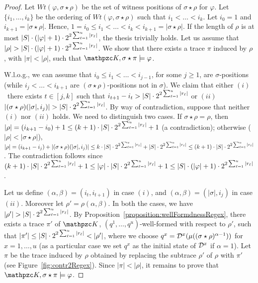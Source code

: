 \begin{proof} 
Let $Wt(\varphi,\sigma\star\rho)$ be the set of witness positions of $\sigma\star\rho$ for $\varphi$.
Let $\{i_1,\ldots,i_k\}$ be the ordering of $Wt(\varphi,\sigma\star\rho)$ such that
$i_1<\ldots <i_k$. Let $i_0=1$ and $i_{k+1}=|\sigma\star\rho|$. Hence, $1=i_0\leq  i_1<\ldots <i_k < i_{k+1}=|\sigma\star\rho|$.
%
If the length of $\rho$ is at most $|S|\cdot (|\varphi|+1) \cdot 2^{2\sum_{\ell=1}^u |r_\ell|}$, the thesis trivially holds.
Let us assume that $|\rho|> |\States|\cdot (|\varphi|+1) \cdot 2^{2\sum_{\ell=1}^u |r_\ell|}$. We show that there exists a trace $\pi$ induced by $\rho$, with $|\pi| < |\rho |$, such that $\Ku,\sigma\star\pi\models \varphi$. 

W.l.o.g., we can assume that $i_0\leq i_1<\ldots <i_{j-1}$, for some $j\geq 1$, are $\sigma$-positions (while $i_{j}<\ldots <i_{k+1}$ are $(\sigma\star\rho)$-positions not in $\sigma$). We claim that either $(i)$~there exists $t\in [j,k]$ such that $i_{t+1}-i_t>|S|\cdot 2^{2\sum_{\ell=1}^u |r_\ell|}$ or $(ii)$~$|(\sigma\star\rho)(|\sigma|,i_{j})|>|\States|\cdot 2^{2\sum_{\ell=1}^u |r_\ell|}$. By way of contradiction, suppose that neither $(i)$ nor $(ii)$ holds. We need to distinguish two cases. 
If $\sigma\star\rho=\rho$, then 
$|\rho| = (i_{k+1}-i_0)+1\leq (k+1) \cdot |S|\cdot 2^{2\sum_{\ell=1}^u |r_\ell|} +1$ (a contradiction); 
otherwise ($|\rho| < |\sigma\star\rho|$), $|\rho| = (i_{k+1} - i_{j}) + |(\sigma\star\rho)(|\sigma|,i_{j})| \leq k \cdot |S|\cdot 2^{2\sum_{\ell=1}^u |r_\ell|} + |S|\cdot 2^{2\sum_{\ell=1}^u |r_\ell|} \leq (k+1) \cdot |S|\cdot 2^{2\sum_{\ell=1}^u |r_\ell|}$. The contradiction follows since $(k+1) \cdot |S|\cdot 2^{2\sum_{\ell=1}^u |r_\ell|}+1 \leq |\varphi| \cdot |S|\cdot 2^{2\sum_{\ell=1}^u |r_\ell|}+1 \leq |S|\cdot (|\varphi|+1)\cdot 2^{2\sum_{\ell=1}^u |r_\ell|}$.
 
Let us define $(\alpha,\beta)=(i_t,i_{t+1})$ in case $(i)$, and $(\alpha,\beta)=(|\sigma|,i_{j})$ in case $(ii)$. Moreover let $\rho'=\rho(\alpha,\beta)$. In both the cases, we have  $|\rho'|> |\States|\cdot 2^{2\sum_{\ell=1}^u |r_\ell|}$.
%
By Proposition~\ref{proposition:wellFormdnessRegex}, there exists a trace $\pi'$ of $\Ku$, $(q^1,\ldots , q^u)$-well-formed with respect to $\rho'$, such that $|\pi'|\leq |S|\cdot 2^{2\sum_{\ell=1}^u |r_\ell|} < |\rho'|$, 
where we choose $q^x=\mathcal{D}^x(\mu((\sigma\star\rho)^{\alpha-1}))$ for $x=1,\ldots , u$ (as a particular case we set $q^x$ as the initial state of $\mathcal{D}^x$ if $\alpha=1$).
Let $\pi$ be the trace induced by $\rho$ obtained by replacing the subtrace $\rho'$ of $\rho$ with $\pi'$ (see Figure~\ref{fig:contr2Regex}). Since $|\pi|<|\rho|$, it remains to prove that  $\Ku,\sigma\star\pi\models \varphi$.


\end{proof}
